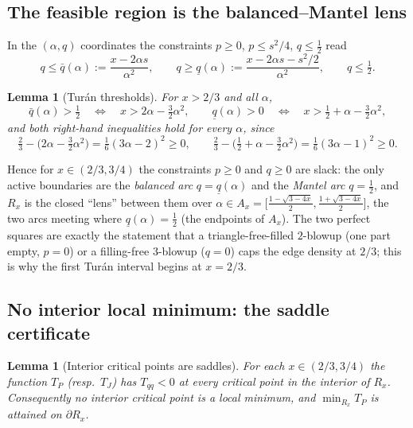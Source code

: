 \documentclass[11pt]{amsart}
\newtheorem{lemma}[theorem]{Lemma}
\theoremstyle{definition}
\begin{document}
\subsection{The feasible region is the balanced--Mantel lens}
\label{sec:lens}

In the $(\alpha,q)$ coordinates the constraints $p\ge0$, $p\le s^2/4$,
$q\le\tfrac12$ read
\[
   q\le \bar q(\alpha):=\frac{x-2\alpha s}{\alpha^2},\qquad
   q\ge \underline q(\alpha):=\frac{x-2\alpha s-s^2/2}{\alpha^2},\qquad
   q\le\tfrac12 .
\]

\begin{lemma}[Tur\'an thresholds]
\label{lem:turan}
For $x>2/3$ and all $\alpha$,
\[
   \bar q(\alpha)>\tfrac12
   \quad\Longleftrightarrow\quad x>2\alpha-\tfrac32\alpha^2,
   \qquad
   \underline q(\alpha)>0
   \quad\Longleftrightarrow\quad x>\tfrac12+\alpha-\tfrac32\alpha^2,
\]
and both right-hand inequalities hold for every $\alpha$, since
\[
   \tfrac23-\bigl(2\alpha-\tfrac32\alpha^2\bigr)=\tfrac16(3\alpha-2)^2\ge0,
   \qquad
   \tfrac23-\bigl(\tfrac12+\alpha-\tfrac32\alpha^2\bigr)=\tfrac16(3\alpha-1)^2\ge0.
\]
\end{lemma}

Hence for $x\in(2/3,3/4)$ the constraints $p\ge0$ and $q\ge0$ are slack: the
only active boundaries are the \emph{balanced arc} $q=\underline q(\alpha)$
and the \emph{Mantel arc} $q=\tfrac12$, and $R_x$ is the closed
``lens'' between them over
$\alpha\in A_x=\bigl[\tfrac{1-\sqrt{3-4x}}2,\tfrac{1+\sqrt{3-4x}}2\bigr]$, the
two arcs meeting where $\underline q(\alpha)=\tfrac12$ (the endpoints of
$A_x$).  The two perfect squares are exactly the statement that a
triangle-free-filled $2$-blowup (one part empty, $p=0$) or a filling-free
$3$-blowup ($q=0$) caps the edge density at $2/3$; this is why the first
Tur\'an interval begins at $x=2/3$.

\subsection{No interior local minimum: the saddle certificate}
\label{sec:saddle}

\begin{lemma}[Interior critical points are saddles]
\label{lem:saddle}
For each $x\in(2/3,3/4)$ the function $T_P$ (resp.\ $T_J$) has $T_{qq}<0$ at
every critical point in the interior of $R_x$.  Consequently no interior
critical point is a local minimum, and $\min_{R_x}T_P$ is attained on
$\partial R_x$.
\end{lemma}
\end{document}
